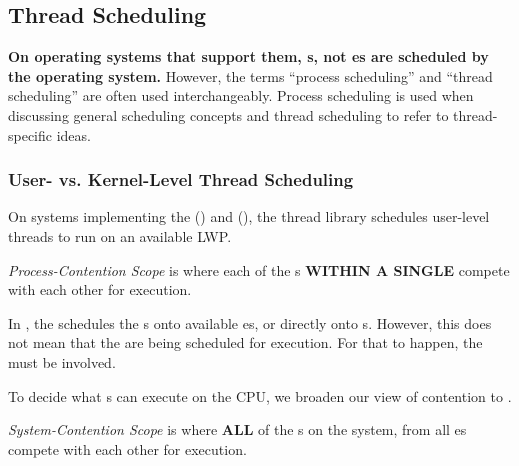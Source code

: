 \subsection{Thread Scheduling}\label{subsec:Thread_Scheduling}
\begin{blackbox}
  \textbf{On operating systems that support them, s, not es are scheduled by the operating system.}
  However, the terms ``process scheduling'' and ``thread scheduling'' are often used interchangeably.
  Process scheduling is used when discussing general scheduling concepts and thread scheduling to refer to thread-specific ideas.
\end{blackbox}

\subsubsection{User- vs. Kernel-Level Thread Scheduling}\label{subsubsec:User_vs_Kernel_Thread_Scheduling}
On systems implementing the  () and  (), the thread library schedules user-level threads to run on an available LWP.\@

\begin{definition}\label{def:Process_Contention_Scope}
  \emph{Process-Contention Scope} is where each of the s \textbf{WITHIN A SINGLE } compete with each other for execution.
\end{definition}

In , the  schedules the s onto available es, or directly onto s.
However, this does not mean that the  are being scheduled for execution.
For that to happen, the  must be involved.

To decide what s can execute on the CPU, we broaden our view of contention to .

\begin{definition}\label{def:System_Contention_Scope}
  \emph{System-Contention Scope} is where \textbf{ALL} of the s on the system, from all es compete with each other for execution.
\end{definition}


